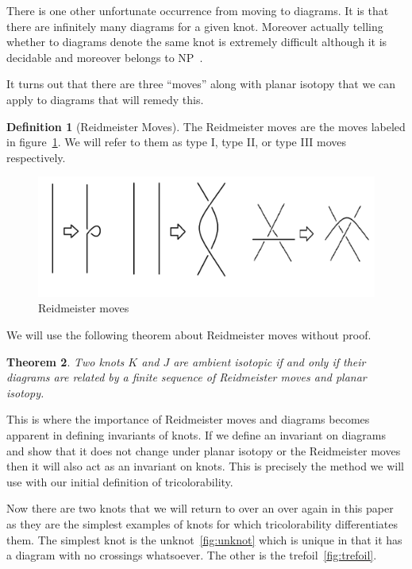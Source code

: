 \documentclass[12pt]{amsart}
\newtheorem{theorem}{Theorem}[section]
\theoremstyle{definition}
\newtheorem{definition}[theorem]{Definition}
\theoremstyle{remark}
\numberwithin{equation}{section}
\newcommand{\ds}{.3}
\begin{document}
There is one other unfortunate occurrence
from moving to diagrams. It is that there are infinitely many diagrams
for a given knot. Moreover actually telling whether to diagrams denote
the same knot is extremely difficult although it is decidable and moreover
belongs to NP~\cite{Poonen}.

It turns out that there are three ``moves'' along with planar isotopy
that we can apply to diagrams that will remedy this.

\begin{definition}[Reidmeister Moves]
  The Reidmeister moves are the moves labeled in figure~\ref{fig:reidmeister}.
  We will refer to them as type I, type II, or type III moves respectively.

  \begin{figure}
    \includegraphics[scale=\ds]{reidmeister}
    \caption{Reidmeister moves}
    \label{fig:reidmeister}
  \end{figure}
\end{definition}

We will use the following theorem about Reidmeister moves without proof.

\begin{theorem}
  Two knots $K$ and $J$ are ambient isotopic if and only if their diagrams
  are related by a finite sequence of Reidmeister moves and planar isotopy.
\end{theorem}

This is where the importance of Reidmeister moves and diagrams becomes apparent
in defining invariants of knots. If we define an invariant on diagrams and show
that it does not change under planar isotopy or the Reidmeister moves then
it will also act as an invariant on knots. This is precisely the method we
will use with our initial definition of tricolorability.

Now there are two knots that we will return to over an over again in this paper
as they are the simplest examples of knots for which tricolorability
differentiates them. The simplest knot is the unknot~\ref{fig:unknot} which
is unique in that it has a diagram with no crossings whatsoever. The
other is the trefoil~\ref{fig:trefoil}.
\end{document}

